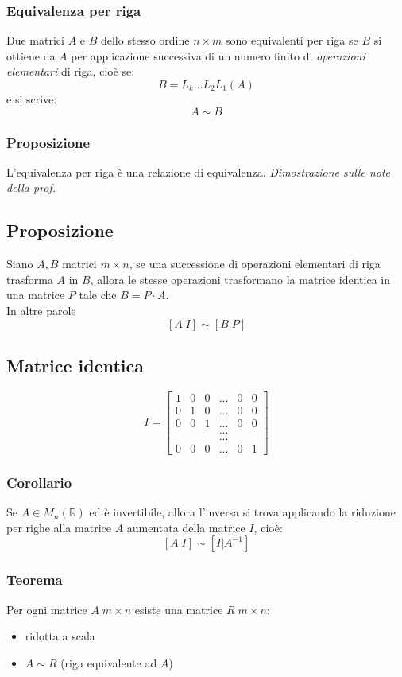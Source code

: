 \subsubsection{Equivalenza per riga}
Due matrici \(A\) e \(B\) dello stesso ordine \(n\times m\) sono equivalenti per riga se \(B\) si ottiene da \(A\) per applicazione successiva di un numero finito di \textit{operazioni elementari} di riga, cioè se:
\[B=L_k...L_2L_1(A)\]
e si scrive:
\[A\sim B\]

\subsubsection{Proposizione}
L'equivalenza per riga è una relazione di equivalenza.
\textit{Dimostrazione sulle note della prof.}

\subsection{Proposizione}
Siano \(A, B\) matrici \(m\times n\), se una successione di operazioni elementari di riga trasforma \(A\) in \(B\), allora le stesse operazioni trasformano la matrice identica in una matrice \(P\) tale che \(B=P\cdot A\).
\\In altre parole
\[[A|I]\sim [B|P]\]

\subsection{Matrice identica}
\begin{equation*}
I = 
\begin{bmatrix}
1 & 0 & 0 & ... &0 & 0\\
0 & 1 & 0 & ... &0 & 0\\
0 & 0 & 1 & ... &0 & 0\\
& &&...\\
& &&...\\
0&0&0&... &0&1
\end{bmatrix}
\end{equation*}

\subsubsection{Corollario}
Se \(A\in M_n(\mathbb{R})\) ed è invertibile, allora l'inversa si trova applicando la riduzione per righe alla matrice \(A\) aumentata della matrice \(I\), cioè:
\[[A|I]\sim [I|A^{-1}]\]

\subsubsection{Teorema}
Per ogni matrice \(A\;m\times n\) esiste una matrice \(R\;m\times n\):
\begin{itemize}
	\item ridotta a scala
	\item \(A\sim R\) (riga equivalente ad \(A\))
\end{itemize}

